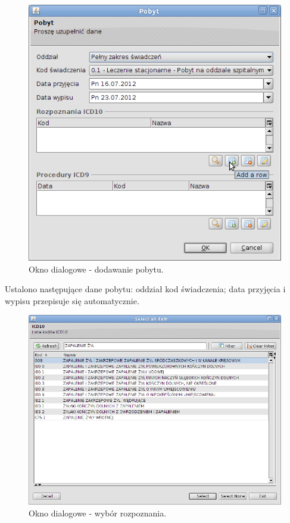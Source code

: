 \begin{figure}%
\centering
\includegraphics[scale=0.4]{images/gruper2}
\caption[Widok grupera]{Okno dialogowe - dodawanie pobytu.}
\label{img:gruper2}
\end{figure}

Ustalono następujące dane pobytu: oddział kod świadczenia; data przyjęcia i wypisu przepisuje się automatycznie.

\begin{figure}%
\centering
\includegraphics[scale=0.4]{images/gruper3}
\caption[Widok grupera]{Okno dialogowe - wybór rozpoznania.}
\label{img:gruper3}
\end{figure}

